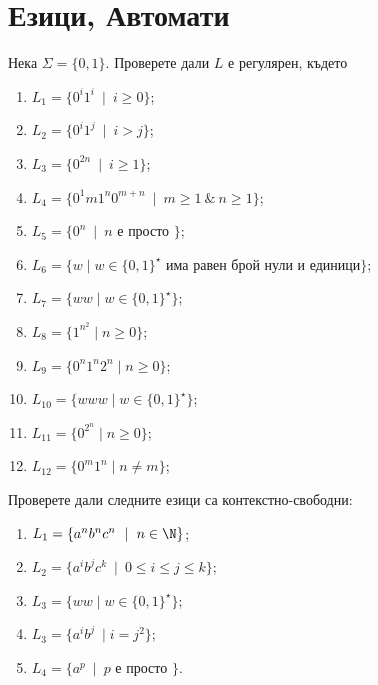 \section{Езици, Автомати}

\begin{problem}
  Нека $\Sigma = \{0,1\}$.  Проверете дали $L$ е регулярен, където
  \begin{enumerate}[1)]
  \item
    $L_1 = \{0^i1^i\ \mid\ i\geq 0\}$;
  \item
    $L_2 = \{0^i1^j\ \mid\ i > j\}$;
  \item
    $L_3 = \{0^{2n}\ \mid\ i\geq 1\}$;
  \item
    $L_4 = \{0^1m1^n0^{m+n}\ \mid\ m\geq 1\ \&\ n\geq 1\}$;
  \item
    $L_5 = \{0^n\ \mid\ n\mbox{ е просто }\}$;
  \item
    $L_6 = \{w\mid w\in\{0,1\}^\star\mbox{ има равен брой нули и единици}\}$;
  \item
    $L_7 = \{ww\mid w\in\{0,1\}^\star\}$;
  \item
    $L_8 = \{1^{n^2}\mid n\geq 0\}$;
  \item
    $L_{9} = \{0^n1^n2^n\mid n\geq 0\}$;
  \item
    $L_{10} = \{www\mid w\in \{0,1\}^\star\}$;
  \item
    $L_{11} = \{0^{2^n}\mid n\geq 0\}$;
  \item
    $L_{12} = \{0^m1^n\mid n\neq m\}$;
  \end{enumerate}
\end{problem}


\begin{problem}
  Проверете дали следните езици са контекстно-свободни:
  \begin{enumerate}
  \item
    $L_1 = \{a^nb^nc^n\ \mid\ n\in\N\}$;
  \item
    $L_2 = \{a^ib^jc^k\ \mid\ 0 \leq i \leq j \leq k\}$;
  \item
    $L_3 = \{ww\mid w\in \{0,1\}^\star\}$;
  \item
    $L_3 = \{a^ib^j\ \mid i = j^2\}$;
  \item
    $L_4 = \{a^p\ \mid\ p\mbox{ е просто }\}$.
  \end{enumerate}
\end{problem}

